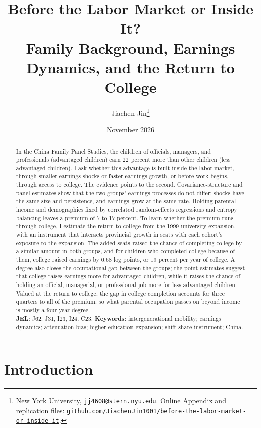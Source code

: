 \documentclass[11pt]{article}
\title{Before the Labor Market or Inside It?\\
Family Background, Earnings Dynamics, and the Return to College}
\author{Jiachen Jin\thanks{\raggedright New York University, \texttt{jj4608@stern.nyu.edu}.
Online Appendix and replication files: \href{\repourl}{\nolinkurl{github.com/JiachenJin1001/before-the-labor-market-or-inside-it}}.}}
\date{November 2026}
\begin{document}
\maketitle

\begin{abstract}
\noindent In the China Family Panel Studies, the children of officials, managers, and
professionals (advantaged children) earn 22 percent more than other
children (less advantaged children). I ask whether this advantage is
built inside the labor market, through smaller earnings shocks or
faster earnings growth, or before work begins, through access to college. The evidence points to the second.
Covariance-structure and panel estimates show that the two groups' earnings processes do not differ: shocks have the same size and persistence, and earnings grow at the same rate. Holding parental income and demographics fixed by correlated random-effects regressions and entropy balancing leaves a premium of 7 to 17 percent. To learn whether the premium runs through college, I estimate the return to college from the 1999 university expansion, with an instrument that interacts provincial growth in seats with each cohort's exposure to the expansion. The added seats raised the chance of completing college by a similar amount in both groups, and for children who completed college because of them, college raised earnings by 0.68 log points, or 19 percent per year of college. A degree also closes the occupational gap between the groups; the point estimates suggest that college raises earnings more for advantaged children, while it raises the chance of holding an official, managerial, or professional job more for less advantaged children. Valued at the return to college, the gap in college completion accounts for three quarters to all of the premium, so what parental occupation passes on beyond income is mostly a four-year degree.\\[4pt]
\textbf{JEL:} J62, J31, I23, I24, C23. \quad \textbf{Keywords:}
intergenerational mobility; earnings dynamics;
attenuation bias; higher
education expansion; shift-share instrument; China.
\end{abstract}

\newpage

\section{Introduction}
\label{sec:intro}
\end{document}
